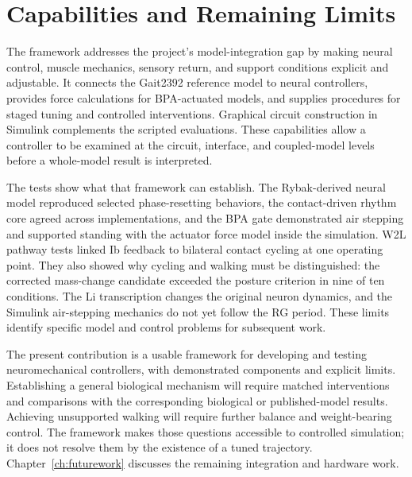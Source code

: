 \section{Capabilities and Remaining Limits}\label{sec:sns_discussion}

The framework addresses the project's model-integration gap by making neural control, muscle mechanics, sensory return, and support conditions explicit and adjustable. It connects the Gait2392 reference model to neural controllers, provides force calculations for BPA-actuated models, and supplies procedures for staged tuning and controlled interventions. Graphical circuit construction in Simulink complements the scripted evaluations. These capabilities allow a controller to be examined at the circuit, interface, and coupled-model levels before a whole-model result is interpreted.

The tests show what that framework can establish. The Rybak-derived neural model reproduced selected phase-resetting behaviors, the contact-driven rhythm core agreed across implementations, and the BPA gate demonstrated air stepping and supported standing with the actuator force model inside the simulation. W2L pathway tests linked Ib feedback to bilateral contact cycling at one operating point. They also showed why cycling and walking must be distinguished: the corrected mass-change candidate exceeded the posture criterion in nine of ten conditions. The Li transcription changes the original neuron dynamics, and the Simulink air-stepping mechanics do not yet follow the RG period. These limits identify specific model and control problems for subsequent work.

The present contribution is a usable framework for developing and testing neuromechanical controllers, with demonstrated components and explicit limits. Establishing a general biological mechanism will require matched interventions and comparisons with the corresponding biological or published-model results. Achieving unsupported walking will require further balance and weight-bearing control. The framework makes those questions accessible to controlled simulation; it does not resolve them by the existence of a tuned trajectory. Chapter~\ref{ch:futurework} discusses the remaining integration and hardware work.
